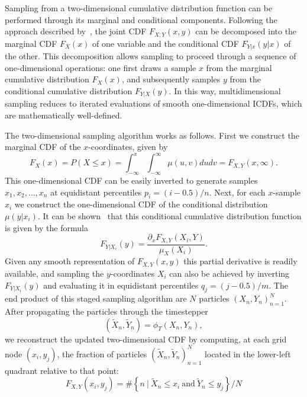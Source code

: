 \documentclass{article}
\begin{document}
Sampling from a two-dimensional cumulative distribution function can be performed through its marginal and conditional components. Following the approach described by~\cite{}, the joint CDF $F_{X,Y}(x,y)$ can be decomposed into the marginal CDF $F_X(x)$ of one variable and the conditional CDF $F_{Y|x}(y|x)$ of the other. This decomposition allows sampling to proceed through a sequence of one-dimensional operations: one first draws a sample $x$ from the marginal cumulative distribution $F_X(x)$, and subsequently samples $y$ from the conditional cumulative distribution $F_{Y|X}(y)$. In this way, multidimensional sampling reduces to iterated evaluations of smooth one-dimensional ICDFs, which are mathematically well-defined.

The two-dimensional sampling algorithm works as follows. First we construct the marginal CDF of the $x$-coordinates, given by
\begin{equation}
    F_X(x) = P(X \leq x) = \int_{-\infty}^x \int_{-\infty}^{\infty} \mu(u,v) dudv = F_{X,Y}(x,\infty).
\end{equation}
This one-dimensional CDF can be easily inverted to generate samples $x_1, x_2, \dots, x_n$ at equidistant percentiles $p_i = (i-0.5)/n$. Next, for each $x$-sample $x_i$ we construct the one-dimensional CDF of the conditional distribution $\mu(y|x_i)$. It can be shown~\cite{} that this conditional cumulative distribution function is given by the formula
\begin{equation} \label{eq:conditional_cdf}
 F_{Y|X_i}(y) = \frac{\partial_x F_{X,Y}(X_i,Y)}{\mu_X(X_i)}.
\end{equation}
Given any smooth representation of $F_{X,Y}(x,y)$ this partial derivative is readily available, and sampling the $y$-coordinates $X_i$ can also be achieved by inverting $F_{Y|X_i}(y)$ and evaluating it in equidistant percentiles $q_j = (j-0.5)/m$. The end product of this staged sampling algorithm are $N$ particles $(X_n, Y_n)_{n=1}^N$. After propagating the particles through the timestepper
\begin{equation}
    (\tilde{X}_n,\tilde{Y}_n) = \phi_T(X_n,Y_n),
\end{equation}
we reconstruct the updated two-dimensional CDF by computing, at each grid node $(x_i, y_j)$, the fraction of particles $(\tilde{X}_n, \tilde{Y}_n )_{n=1}^N$ located in the lower-left quadrant relative to that point:
\begin{equation}
    F_{X,Y}(x_i,y_j) = \#\left\{ n \ | \ \tilde{X}_n \leq x_i \ \text{and} \ \tilde{Y}_n \leq y_j \right\} / N
\end{equation}
\end{document}
